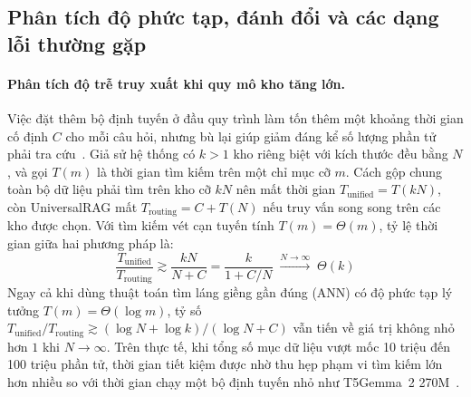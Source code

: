 \subsection{Phân tích độ phức tạp, đánh đổi và các dạng lỗi thường gặp}
\label{subsec:ur_tradeoffs}

\paragraph{Phân tích độ trễ truy xuất khi quy mô kho tăng lớn.}
Việc đặt thêm bộ định tuyến ở đầu quy trình làm tốn thêm một khoảng thời gian cố định $C$ cho mỗi câu hỏi, nhưng bù lại giúp giảm đáng kể số lượng phần tử phải tra cứu~\cite{yeo2026universalrag}. Giả sử hệ thống có $k > 1$ kho riêng biệt với kích thước đều bằng $N$, và gọi $T(m)$ là thời gian tìm kiếm trên một chỉ mục cỡ $m$. Cách gộp chung toàn bộ dữ liệu phải tìm trên kho cỡ $kN$ nên mất thời gian $T_{\mathrm{unified}} = T(kN)$, còn UniversalRAG mất $T_{\mathrm{routing}} = C + T(N)$ nếu truy vấn song song trên các kho được chọn. Với tìm kiếm vét cạn tuyến tính $T(m) = \Theta(m)$, tỷ lệ thời gian giữa hai phương pháp là:
\begin{equation}
    \frac{T_{\mathrm{unified}}}{T_{\mathrm{routing}}} \gtrsim \frac{kN}{N + C} = \frac{k}{1 + C/N} \;\xrightarrow{N \to \infty}\; \Theta(k)
    \label{eq:ur_latency_linear}
\end{equation}
Ngay cả khi dùng thuật toán tìm láng giềng gần đúng (ANN) có độ phức tạp lý tưởng $T(m) = \Theta(\log m)$, tỷ số $T_{\mathrm{unified}} / T_{\mathrm{routing}} \gtrsim (\log N + \log k) / (\log N + C)$ vẫn tiến về giá trị không nhỏ hơn $1$ khi $N \to \infty$. Trên thực tế, khi tổng số mục dữ liệu vượt mốc 10 triệu đến 100 triệu phần tử, thời gian tiết kiệm được nhờ thu hẹp phạm vi tìm kiếm lớn hơn nhiều so với thời gian chạy một bộ định tuyến nhỏ như T5Gemma~2 270M~\cite{yeo2026universalrag}.


